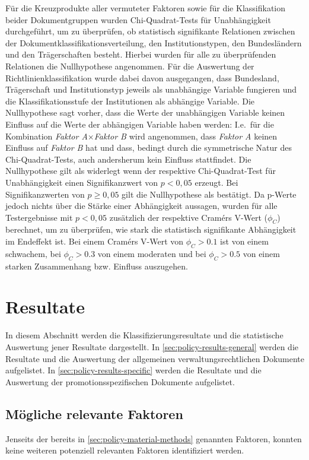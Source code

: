 Für die Kreuzprodukte aller vermuteter Faktoren sowie für die Klassifikation beider Dokumentgruppen wurden Chi-Quadrat-Tests für Unabhängigkeit durchgeführt, um zu überprüfen, ob statistisch signifikante Relationen zwischen der Dokumentklassifikationsverteilung, den Institutionstypen, den Bundesländern und den Trägerschaften besteht.
Hierbei wurden für alle zu überprüfenden Relationen die Nullhypothese angenommen.
Für die Auswertung der Richtlinienklassifikation wurde dabei davon ausgegangen, dass Bundesland, Trägerschaft und Institutionstyp jeweils als unabhängige Variable fungieren und die Klassifikationsstufe der Institutionen als abhängige Variable.
Die Nullhypothese sagt vorher, dass die Werte der unabhängigen Variable keinen Einfluss auf die Werte der abhängigen Variable haben werden:
I.e.~für die Kombination \textit{Faktor A}$\times$\textit{Faktor B} wird angenommen, dass \textit{Faktor A} keinen Einfluss auf \textit{Faktor B} hat und dass, bedingt durch die symmetrische Natur des Chi-Quadrat-Tests, auch andersherum kein Einfluss stattfindet.
Die Nullhypothese gilt als widerlegt wenn der respektive Chi-Quadrat-Test für Unabhängigkeit einen Signifikanzwert von $p<0,05$ erzeugt.
Bei Signifikanzwerten von $p\geqslant0,05$ gilt die Nullhypothese als bestätigt.
Da p-Werte jedoch nichts über die Stärke einer Abhängigkeit aussagen, wurden für alle Testergebnisse mit $p<0,05$ zusätzlich der respektive Cramérs V-Wert ($\phi_C$) berechnet, um zu überprüfen, wie stark die statistisch signifikante Abhängigkeit im Endeffekt ist.
Bei einem Cramérs V-Wert von $\phi_C>\num{0,1}$ ist von einem schwachem, bei $\phi_C>\num{0,3}$ von einem moderaten und bei $\phi_C>\num{0,5}$ von einem starken Zusammenhang bzw. Einfluss auszugehen.

\section{Resultate}\label{sec:policy-results}
In diesem Abschnitt werden die Klassifizierungsresultate und die statistische Auswertung jener Resultate dargestellt.
In \cref{sec:policy-results-general} werden die Resultate und die Auswertung der allgemeinen verwaltungsrechtlichen Dokumente aufgelistet.
In \cref{sec:policy-results-specific} werden die Resultate und die Auswertung der promotionsspezifischen Dokumente aufgelistet.

\subsection{Mögliche relevante Faktoren}
Jenseits der bereits in \cref{sec:policy-material-methods} genannten Faktoren, konnten keine weiteren potenziell relevanten Faktoren identifiziert werden.

